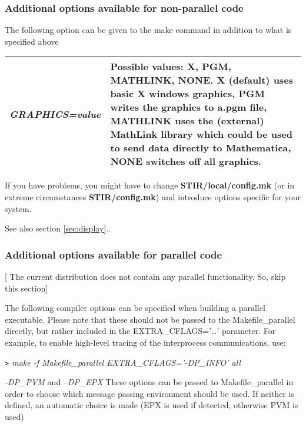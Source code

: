 \documentclass{article}
\begin{document}
\subsubsection{
Additional options available for non-parallel code}
\label{sec:compilationgraphics}
The following option can be given to the make command in addition 
to what is specified above

\begin{longtable}{|p{\MakeTableFirstCol}|p{\MakeTableSecondCol}|}
\hline
{\raggedright \textit{GRAPHICS=value}} & 
{\raggedright Possible values: X, PGM, MATHLINK, NONE. X (default) uses basic 
X windows graphics, PGM writes the graphics to a.pgm file, MATHLINK 
uses the (external) MathLink library which could be used to send 
data directly to Mathematica, NONE switches off all graphics.} \\
\hline
\end{longtable}


If you have problems, you might have to change \textbf{STIR/local/config.mk}
(or in extreme circumstances \textbf{STIR/config.mk}) and introduce options 
specific for your system.


See also section \ref{sec:display}..

\subsubsection{
Additional options available for parallel code}

[ The current distribution does not contain any parallel functionality. 
So, skip this section]


The following compiler options can be specified when building 
a parallel executable. Please note that these should not be passed 
to the Makefile\_parallel directly, but rather included in the 
EXTRA\_CFLAGS='\dots ' parameter. For example, to enable high-level 
tracing of the interprocess communications, use:


\textit{\texttt{>} make -f Makefile\_parallel EXTRA\_CFLAGS='-DP\_INFO' all}


\textit{-DP\_PVM} and --\textit{DP\_EPX}
These options can be passed to Makefile\_parallel in order to 
choose which message passing environment should be used. If neither 
is defined, an automatic choice is made (EPX is used if detected, 
otherwise PVM is used)
\end{document}
